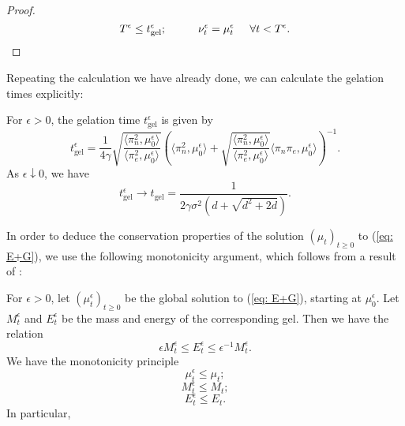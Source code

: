 \begin{proof}
\begin{equation}
        T^\epsilon \leq t^\epsilon_\text{gel}; \hspace{1cm} \nu^\epsilon_t=\mu^\epsilon_t \hspace{0.5cm}\forall t<T^\epsilon.
    \end{equation} \end{proof}  Repeating the calculation we have already done, we can calculate the gelation times explicitly: \begin{lemma}\label{lemma: calculation of gelation} For $\epsilon>0$, the gelation time $t_\text{gel}^\epsilon$ is given by \begin{equation} t_\text{gel}^\epsilon = \frac{1}{4\gamma}\sqrt{\frac{\langle \pi_n^2, \mu_0^\epsilon\rangle}{\langle \pi_e^2, \mu_0^\epsilon\rangle}}\left(\langle \pi_n^2, \mu_0^\epsilon\rangle+\sqrt{\frac{\langle \pi_n^2, \mu_0^\epsilon\rangle}{\langle \pi_e^2, \mu_0^\epsilon\rangle}}\langle \pi_n\pi_e, \mu_0^\epsilon\rangle \right)^{-1}. \end{equation} As $\epsilon \downarrow 0$, we have \begin{equation}
    t_\text{gel}^\epsilon \rightarrow t_\text{gel} = \frac{1}{2\gamma \sigma^2(d+\sqrt{d^2+2d})}.
\end{equation}  \end{lemma} In order to deduce the conservation properties of the solution $(\mu_t)_{t\geq 0}$ to (\ref{eq: E+G}), we use the following monotonicity argument, which follows from a result of \cite{N00}: \begin{lemma}
    For $\epsilon>0$, let $(\mu^\epsilon_t)_{t\geq 0}$ be the global solution to (\ref{eq: E+G}), starting at $\mu_0^\epsilon.$ Let $M^\epsilon_t$ and $E^\epsilon_t$ be the mass and energy of the corresponding gel. Then we have the relation \begin{equation}
        \epsilon M^\epsilon_t \leq E^\epsilon_t \leq \epsilon^{-1}M^\epsilon_t.
    \end{equation}We have the monotonicity principle\begin{equation}
        \mu^\epsilon_t \leq \mu_t;
    \end{equation}\begin{equation}
        M^\epsilon_t \leq M_t;
    \end{equation}
    \begin{equation}
        E^\epsilon_t \leq E_t.
    \end{equation} In particular, \begin{enumerate}[label=\roman{*}).]

\end{enumerate}
\end{lemma}
